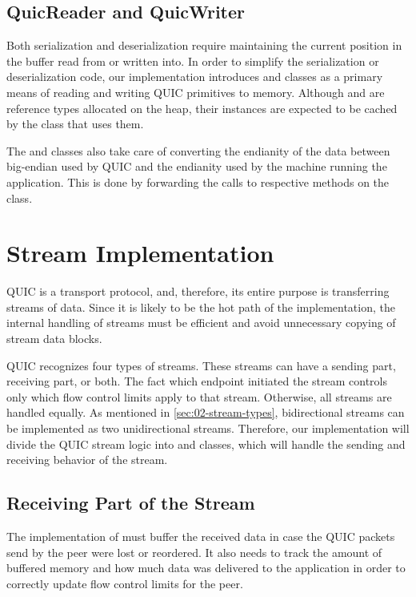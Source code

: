 \subsection{QuicReader and QuicWriter}

Both serialization and deserialization require maintaining the current position in the buffer read
from or written into. In order to simplify the serialization or deserialization code, our
implementation introduces \QuicReader{} and \QuicWriter{} classes as a primary means of reading and
writing QUIC primitives to memory. Although \QuicReader{} and \QuicWriter{} are reference types
allocated on the heap, their instances are expected to be cached by the class that uses them.

The \QuicReader{} and \QuicWriter{} classes also take care of converting the endianity of the data
between big-endian used by QUIC and the endianity used by the machine running the application. This
is done by forwarding the calls to respective methods on the  class.

\section{Stream Implementation}

QUIC is a transport protocol, and, therefore, its entire purpose is transferring streams of data.
Since it is likely to be the hot path of the implementation, the internal handling of streams must
be efficient and avoid unnecessary copying of stream data blocks.

QUIC recognizes four types of streams. These streams can have a sending part, receiving part, or
both. The fact which endpoint initiated the stream controls only which flow control limits apply to
that stream. Otherwise, all streams are handled equally. As mentioned in
\autoref{sec:02-stream-types}, bidirectional streams can be implemented as two unidirectional
streams. Therefore, our implementation will divide the QUIC stream logic into \SendStream{} and
\ReceiveStream{} classes, which will handle the sending and receiving behavior of the stream.

\subsection{Receiving Part of the Stream}

The implementation of \ReceiveStream{} must buffer the received data in case the QUIC packets send
by the peer were lost or reordered. It also needs to track the amount of buffered memory and how
much data was delivered to the application in order to correctly update flow control limits for the
peer.

